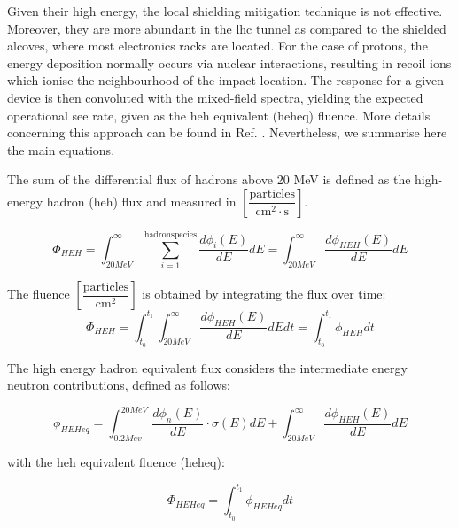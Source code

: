 \documentclass[encoding=utf8,british]{tumphthesis}
\begin{document}
Given their high energy, the local shielding mitigation technique is not effective. Moreover, they are more abundant in the \acrshort{lhc} tunnel as compared to the shielded alcoves, where most electronics racks are located. For the case of protons, the energy deposition normally occurs via nuclear interactions, resulting in recoil ions which ionise the neighbourhood of the impact location. The response for a given device is then convoluted with the mixed-field spectra, yielding the expected operational \acrshort{see} rate, given as the \acrshort{heh} equivalent (\acrshort{heheq}) fluence. More details concerning this approach can be found in Ref. \cite{Infantino:2291683}. Nevertheless, we summarise here the main equations.



The sum of the differential flux of hadrons above 20 MeV is defined as the high-energy hadron (\acrshort{heh}) flux and measured in $ \left[ \dfrac{\mathrm{particles}}{\mathrm{cm}^2 \cdot \mathrm{s}} \right]$.


\begin{equation}
    \Phi_{HEH} = \int_{20MeV}^{\infty} \sum_{i=1}^{\mathrm{hadron species}} \frac{d\phi_i(E)}{dE} dE = \int_{20MeV}^{\infty} \frac{d\phi_{HEH}(E)}{dE} dE
    \label{eqn:heh_hadron_species}
\end{equation}


The fluence $\left[ \dfrac{\mathrm{particles}}{\mathrm{cm}^2} \right]$ is obtained by integrating the flux over time:
\begin{equation}
    \Phi_{HEH} = \int_{t_0}^{t_1} \int_{20MeV}^{\infty} \frac{d \phi_{HEH}(E)}{dE} dE dt = \int_{t_0}^{t_1} \phi_{HEH} dt
\end{equation}



The high energy hadron equivalent flux considers the intermediate energy neutron contributions, defined as follows:

\begin{equation}
    \phi_{HEHeq} = \int_{0.2Mev}^{20MeV}\frac{d\phi_n(E)}{dE}\cdot \sigma(E) dE + \int_{20MeV}^{\infty} \frac{d\phi_{HEH}(E)}{dE} dE
\end{equation}

with the \acrshort{heh} equivalent fluence (\acrshort{heheq}):

\begin{equation}
    \Phi_{HEHeq} = \int_{t_0}^{t_1} \phi_{HEHeq} dt 
\end{equation}
\end{document}
